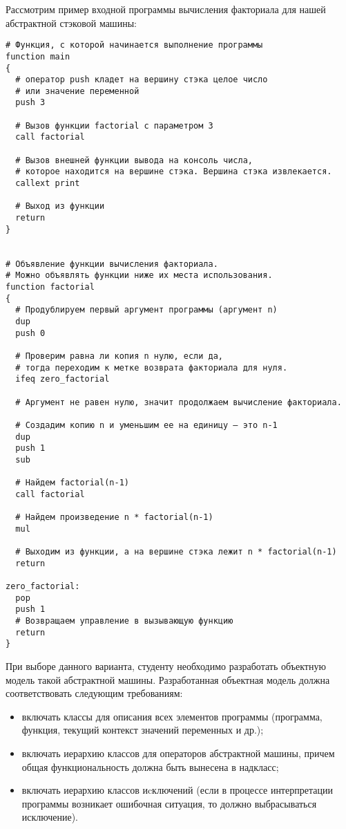 \documentclass[a4paper,12pt]{article}
\begin{document}
Рассмотрим пример входной программы вычисления факториала для нашей
абстрактной стэковой машины:

\begin{verbatim}
# Функция, с которой начинается выполнение программы
function main
{
  # оператор push кладет на вершину стэка целое число
  # или значение переменной
  push 3

  # Вызов функции factorial с параметром 3
  call factorial   

  # Вызов внешней функции вывода на консоль числа,
  # которое находится на вершине стэка. Вершина стэка извлекается.
  callext print

  # Выход из функции
  return
}


# Объявление функции вычисления факториала.
# Можно объявлять функции ниже их места использования.
function factorial
{
  # Продублируем первый аргумент программы (аргумент n)
  dup 
  push 0

  # Проверим равна ли копия n нулю, если да,
  # тогда переходим к метке возврата факториала для нуля.
  ifeq zero_factorial

  # Аргумент не равен нулю, значит продолжаем вычисление факториала.
    
  # Создадим копию n и уменьшим ее на единицу – это n-1
  dup
  push 1
  sub

  # Найдем factorial(n-1)
  call factorial
   
  # Найдем произведение n * factorial(n-1)
  mul

  # Выходим из функции, а на вершине стэка лежит n * factorial(n-1)
  return

zero_factorial:
  pop
  push 1
  # Возвращаем управление в вызывающую функцию
  return
}
\end{verbatim}

При выборе данного варианта, студенту необходимо разработать объектную
модель такой абстрактной машины. Разработанная объектная модель должна
соответствовать следующим требованиям:

\begin{itemize}
\item включать классы для описания всех элементов программы
  (программа, функция, текущий контекст значений переменных и др.);
\item включать иерархию классов для операторов абстрактной машины,
  причем общая функциональность должна быть вынесена в надкласс;
\item включать иерархию классов иcключений (если в процессе
  интерпретации программы возникает ошибочная ситуация, то должно
  выбрасываться исключение).
\end{itemize}
\end{document}

